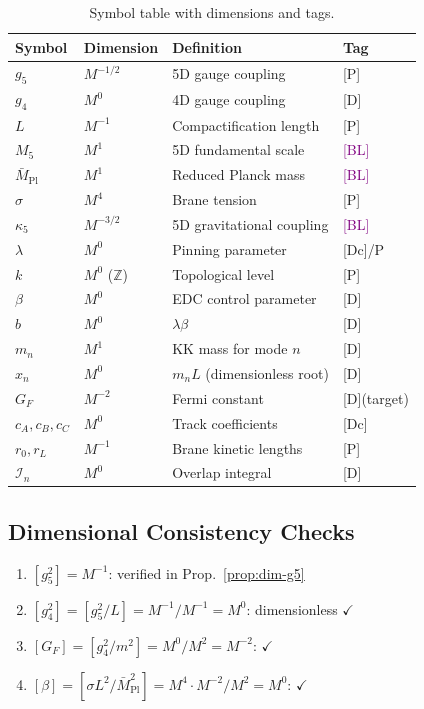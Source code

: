\documentclass[11pt,a4paper]{article}
\newcommand{\tagD}{\textcolor{blue!70!black}{[D]}}
\newcommand{\tagDc}{\textcolor{blue!50!black}{[Dc]}}
\newcommand{\tagP}{\textcolor{green!50!black}{[P]}}
\newcommand{\tagBL}{\textcolor{purple}{[BL]}}
\begin{document}
\begin{table}[h]
\centering
\begin{tabular}{llll}
\toprule
Symbol & Dimension & Definition & Tag \\
\midrule
$g_5$ & $M^{-1/2}$ & 5D gauge coupling & \tagP \\
$g_4$ & $M^0$ & 4D gauge coupling & \tagD \\
$L$ & $M^{-1}$ & Compactification length & \tagP \\
$M_5$ & $M^1$ & 5D fundamental scale & \tagBL \\
$\bar{M}_{\text{Pl}}$ & $M^1$ & Reduced Planck mass & \tagBL \\
$\sigma$ & $M^4$ & Brane tension & \tagP \\
$\kappa_5$ & $M^{-3/2}$ & 5D gravitational coupling & \tagBL \\
$\lambda$ & $M^0$ & Pinning parameter & \tagDc/P \\
$k$ & $M^0$ ($\mathbb{Z}$) & Topological level & \tagP \\
$\beta$ & $M^0$ & EDC control parameter & \tagD \\
$b$ & $M^0$ & $\lambda\beta$ & \tagD \\
$m_n$ & $M^1$ & KK mass for mode $n$ & \tagD \\
$x_n$ & $M^0$ & $m_n L$ (dimensionless root) & \tagD \\
$G_F$ & $M^{-2}$ & Fermi constant & \tagD (target) \\
$c_A, c_B, c_C$ & $M^0$ & Track coefficients & \tagDc \\
$r_0, r_L$ & $M^{-1}$ & Brane kinetic lengths & \tagP \\
$\mathcal{I}_n$ & $M^0$ & Overlap integral & \tagD \\
\bottomrule
\end{tabular}
\caption{Symbol table with dimensions and tags.}
\label{tab:symbols}
\end{table}

\subsection{Dimensional Consistency Checks}

\begin{enumerate}
    \item $[g_5^2] = M^{-1}$: verified in Prop.~\ref{prop:dim-g5}
    \item $[g_4^2] = [g_5^2/L] = M^{-1}/M^{-1} = M^0$: dimensionless $\checkmark$
    \item $[G_F] = [g_4^2/m^2] = M^0/M^2 = M^{-2}$: $\checkmark$
    \item $[\beta] = [\sigma L^2/\bar{M}_{\text{Pl}}^2] = M^4 \cdot M^{-2}/M^2 = M^0$: $\checkmark$
\end{enumerate}
\end{document}
